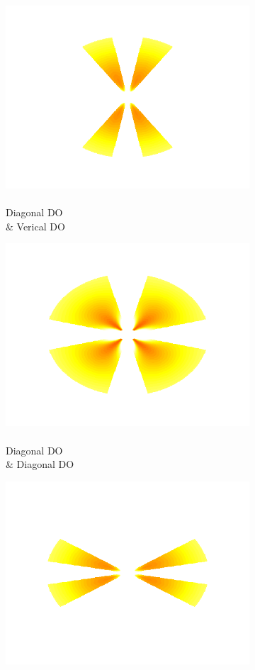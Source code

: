 \documentclass[journal,onecolumn]{IEEEtran}
\begin{document}
\begin{figure}[h]
\begin{subfigure}[b]{0.2\textwidth}
            \includegraphics[width=.85\linewidth]{j_2_1}
            \caption{\\ Diagonal DO \\ \& Verical DO}
    \end{subfigure}%
    \begin{subfigure}[b]{0.2\textwidth}
            \centering
            \captionsetup{justification=centering}
            \includegraphics[width=.85\linewidth]{j_2_2}
            \caption{\\ Diagonal DO \\ \& Diagonal DO}
    \end{subfigure}%
    \begin{subfigure}[b]{0.2\textwidth}
            \centering
            \captionsetup{justification=centering}
            \includegraphics[width=.85\linewidth]{j_2_3}

\end{subfigure}
\end{figure}
\end{document}
